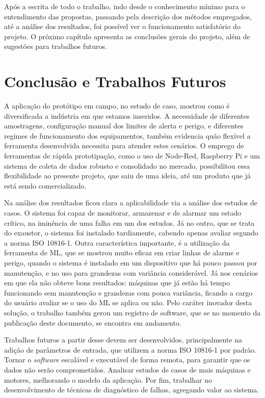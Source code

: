 \documentclass[a4paper]{ifacconf}
\begin{document}
Após a escrita de todo o trabalho, indo desde o conhecimento mínimo para o entendimento das propostas, passando pela descrição dos métodos
empregados, até a análise dos resultados, foi possível ver o funcionamento satisfatório do projeto. O próximo capítulo apresenta as conclusões
gerais do projeto, além de sugestões para trabalhos futuros.


\section{Conclusão e Trabalhos Futuros}

A aplicação do protótipo em campo, no estudo de caso, mostrou como é diversificada a indústria em que estamos inseridos. 
A necessidade de diferentes amostragens, configuração manual dos limites de alerta e perigo, e diferentes regimes de funcionamento dos
equipamentos, também evidencia quão flexível a ferramenta desenvolvida necessita para atender estes cenários. O emprego de ferramentas de 
rápida prototipação, como o uso de Node-Red, Raspberry Pi e um sistema de coleta de dados robusto e consolidado no mercado, possibilitou essa 
flexibilidade ao presente projeto, que saiu de uma ideia, até um produto que já está sendo comercializado.

Na análise dos resultados ficou clara a aplicabilidade via a análise dos estudos de casos. O sistema foi
capaz de monitorar, armazenar e de alarmar um estado crítico, na iminência de uma falha em um dos estudos. Já no outro, que se trata do exaustor,
o sistema foi instalado tardiamente, cabendo apenas avaliar segundo a norma ISO 10816-1. Outra característica importante, é a utilização da
ferramenta de ML, que se mostrou muito eficaz em criar linhas de alarme e perigo, quando o sistema é instalado em um dispositivo
que há pouco passou por manutenção, e no uso para grandezas com variância considerável. Já nos cenários em que ela não obteve bons resultados:
máquinas que já estão há tempo funcionando sem manutenção e grandezas com pouca variância, ficando a cargo do usuário avaliar se o uso do 
ML se aplica ou não. Pelo caráter inovador desta solução, o trabalho também gerou um registro de software, que se no momento da publicação deste 
documento, se encontra em andamento.

Trabalhos futuros a partir desse devem ser desenvolvidos, principalmente na adição de parâmetros de entrada, que utilizem a norma ISO 10816-1
por padrão. Tornar o \textit{software} escalável e executável de forma remota, para garantir que os dados não serão comprometidos. Analisar estudos de 
casos de mais máquinas e motores, melhorando o modelo da aplicação. Por fim, trabalhar no desenvolvimento de técnicas de diagnóstico de falhas,
agregando valor ao sistema.

\end{document}

